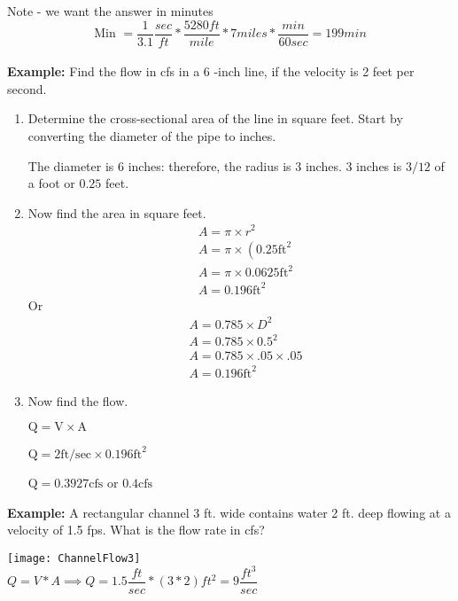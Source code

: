Note - we want the answer in minutes\\

$$\textrm{Min } = \dfrac{1}{3.1}\dfrac{sec}{ft}*\dfrac{5280ft}{mile}*7 miles*\dfrac{min}{60 sec} = \boxed{199 min}$$
\\

\textbf{Example:} Find the flow in cfs in a 6 -inch line, if the velocity is 2 feet per second.

\begin{enumerate}
\item Determine the cross-sectional area of the line in square feet. Start by converting the diameter of the pipe to inches.

The diameter is 6 inches: therefore, the radius is 3 inches. 3 inches is $3 / 12$ of a foot or $0.25$ feet.

\item Now find the area in square feet.
$$
\begin{aligned}
&A=\pi \times r^{2} \\
&A=\pi \times\left(0.25 \mathrm{ft}^{2}\right. \\
&A=\pi \times 0.0625 \mathrm{ft}^{2} \\
&A=0.196 \mathrm{ft}^{2}
\end{aligned}
$$
Or
$$
\begin{aligned}
&A=0.785 \times D^{2} \\
&A=0.785 \times 0.5^{2} \\
&A=0.785 \times .05 \times .05 \\
&A=0.196 \mathrm{ft}^{2}
\end{aligned}
$$

\item Now find the flow.

$\mathrm{Q}=\mathrm{V} \times \mathrm{A}$

$\mathrm{Q}=2 \mathrm{ft} / \mathrm{sec} \times 0.196 \mathrm{ft}^{2}$

$\mathrm{Q}=0.3927 \mathrm{cfs}$ or $0.4 \mathrm{cfs}$

\end{enumerate}


\textbf{Example:} A rectangular channel 3 ft. wide contains water 2 ft. deep flowing at a velocity of 1.5 fps.
What is the flow rate in cfs?

\texttt{[image: ChannelFlow3]}\\
$Q=V*A \implies Q = 1.5 \dfrac{ft}{sec}*(3*2)ft^2=\boxed{9\dfrac{ft^3}{sec}}$

\vspace{1cm}

